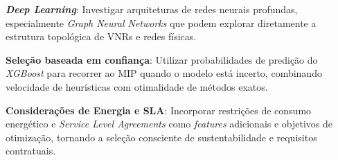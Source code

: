 \documentclass[conference]{IEEEtran}
\begin{document}
\textbf{\textit{Deep Learning}}: Investigar arquiteturas de redes neurais profundas, especialmente \textit{Graph Neural Networks} que podem explorar diretamente a estrutura topológica de VNRs e redes físicas.

\textbf{Seleção baseada em confiança}: Utilizar probabilidades de predição do \textit{XGBoost} para recorrer ao MIP quando o modelo está incerto, combinando velocidade de heurísticas com otimalidade de métodos exatos.

\textbf{Considerações de Energia e SLA}: Incorporar restrições de consumo energético e \textit{Service Level Agreements} como \textit{features} adicionais e objetivos de otimização, tornando a seleção consciente de sustentabilidade e requisitos contratuais.





\end{document}
